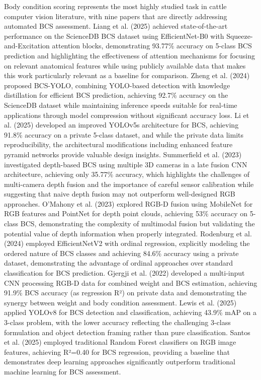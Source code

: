 Body condition scoring represents the most highly studied task in cattle computer vision literature, with nine papers that are directly addressing automated BCS assessment. Liang et al. (2025) \cite{liang2025bcs} achieved state-of-the-art performance on the ScienceDB BCS dataset using EfficientNet-B0 with Squeeze-and-Excitation attention blocks, demonstrating 93.77\% accuracy on 5-class BCS prediction and highlighting the effectiveness of attention mechanisms for focusing on relevant anatomical features while using publicly available data that makes this work particularly relevant as a baseline for comparison. Zheng et al. (2024) \cite{zheng2024bcsyolo} proposed BCS-YOLO, combining YOLO-based detection with knowledge distillation for efficient BCS prediction, achieving 92.7\% accuracy on the ScienceDB dataset while maintaining inference speeds suitable for real-time applications through model compression without significant accuracy loss. Li et al. (2025) \cite{li2025yolov5bcs} developed an improved YOLOv5s architecture for BCS, achieving 91.8\% accuracy on a private 5-class dataset, and while the private data limits reproducibility, the architectural modifications including enhanced feature pyramid networks provide valuable design insights. Summerfield et al. (2023) \cite{summerfield2023depth} investigated depth-based BCS using multiple 3D cameras in a late fusion CNN architecture, achieving only 35.77\% accuracy, which highlights the challenges of multi-camera depth fusion and the importance of careful sensor calibration while suggesting that naive depth fusion may not outperform well-designed RGB approaches. O'Mahony et al. (2023) \cite{omahony2023rgbd} explored RGB-D fusion using MobileNet for RGB features and PointNet for depth point clouds, achieving 53\% accuracy on 5-class BCS, demonstrating the complexity of multimodal fusion but validating the potential value of depth information when properly integrated. Rodenburg et al. (2024) \cite{rodenburg2024ordinal} employed EfficientNetV2 with ordinal regression, explicitly modeling the ordered nature of BCS classes and achieving 84.6\% accuracy using a private dataset, demonstrating the advantage of ordinal approaches over standard classification for BCS prediction. Gjergji et al. (2022) \cite{gjergji2022weight} developed a multi-input CNN processing RGB-D data for combined weight and BCS estimation, achieving 91.9\% BCS accuracy (as regression R²) on private data and demonstrating the synergy between weight and body condition assessment. Lewis et al. (2025) \cite{lewis2025yolov8bcs} applied YOLOv8 for BCS detection and classification, achieving 43.9\% mAP on a 3-class problem, with the lower accuracy reflecting the challenging 3-class formulation and object detection framing rather than pure classification. Santos et al. (2025) \cite{santos2025rf} employed traditional Random Forest classifiers on RGB image features, achieving R²=0.40 for BCS regression, providing a baseline that demonstrates deep learning approaches significantly outperform traditional machine learning for BCS assessment.

